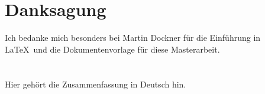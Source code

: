 \documentclass[12pt,pagesize,twoside,DIV=12,headsepline=0.4pt]{scrbook}
\begin{document}



\tableofcontents					%

\chapter*{Danksagung}
\label{ch:danksagung}
Ich bedanke mich besonders bei Martin Dockner für die Einführung in \LaTeX\ und die Dokumentenvorlage für diese Masterarbeit.

\chapter*{\abstractname}

Hier gehört die Zusammenfassung in Deutsch hin.

\vspace{1.3em} 					%
\end{document}
